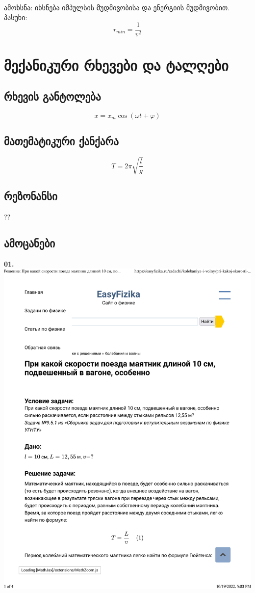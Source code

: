 \documentclass[a4paper]{book}
\begin{document}
ამოხსნა:	იხსნება იმპულსის მუდმივობისა და ენერგიის მუდმივობით.\\
პასუხი: $$ r_{min} = \frac{1}{v^2} $$

\chapter{მექანიკური რხევები და ტალღები}
\section{რხევის განტოლება}
$$x=x_m\cos(\omega t + \varphi)$$
\section{მათემატიკური ქანქარა}

$$T = 2\pi \sqrt{\dfrac{l}{g}}$$

\section{რეზონანსი}
??

\section{ამოცანები}
\textbf{01.}
\includegraphics[width=0.9\columnwidth]{temp_pdfs/1.pdf}
\end{document}
